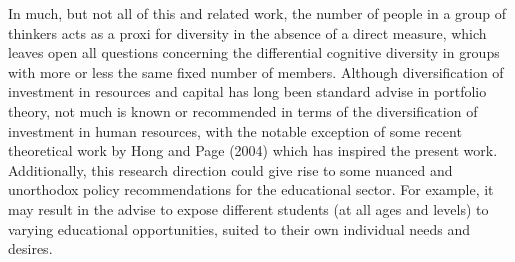 \documentclass[12pt]{article}
\begin{document}
In much, but not all of this and related work, the number of people in a group of thinkers acts as a proxi for diversity in the absence of a direct measure, which leaves open all questions concerning the differential cognitive diversity in groups with more or less the same fixed number of members. Although diversification of investment in resources and capital has long been standard advise in portfolio theory, not much is known or recommended in terms of the diversification of investment in human resources, with the notable exception of some recent theoretical work by Hong and Page (2004) which has inspired the present work. Additionally, this research direction could give rise to some nuanced and unorthodox policy recommendations for the educational sector. For example, it may result in the advise to expose different students (at all ages and levels) to varying educational opportunities, suited to their own individual needs and desires.\\
\end{document}
